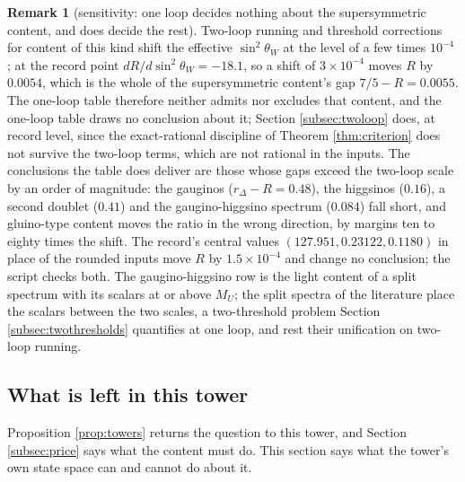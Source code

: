 \documentclass[11pt]{article}
\theoremstyle{definition}
\newtheorem{remark}[theorem]{Remark}
\newcommand{\Dl}{\Delta}
\begin{document}
\begin{remark}[sensitivity: one loop decides nothing about the supersymmetric content, and does decide the rest]\label{rem:sensitivity}
Two-loop running and threshold corrections for content of this kind shift the effective $\sin^{2}\theta_{W}$ at the level of a few times $10^{-4}$ \cite{Amaldi1991, DimopoulosRabyWilczek1981}; at the record point $dR/d\sin^{2}\theta_{W} = -18.1$, so a shift of $3 \times 10^{-4}$ moves $R$ by $0.0054$, which is the whole of the supersymmetric content's gap $7/5 - R = 0.0055$. The one-loop table therefore neither admits nor excludes that content, and the one-loop table draws no conclusion about it; Section \ref{subsec:twoloop} does, at record level, since the exact-rational discipline of Theorem \ref{thm:criterion} does not survive the two-loop terms, which are not rational in the inputs. The conclusions the table does deliver are those whose gaps exceed the two-loop scale by an order of magnitude: the gauginos ($r_{\Dl} - R = 0.48$), the higgsinos ($0.16$), a second doublet ($0.41$) and the gaugino-higgsino spectrum ($0.084$) fall short, and gluino-type content moves the ratio in the wrong direction, by margins ten to eighty times the shift. The record's central values $(127.951, 0.23122, 0.1180)$ in place of the rounded inputs move $R$ by $1.5 \times 10^{-4}$ and change no conclusion; the script checks both. The gaugino-higgsino row is the light content of a split spectrum with its scalars at or above $M_{U}$; the split spectra of the literature \cite{GiudiceRomanino2004, ArkaniHamedDimopoulos2005} place the scalars between the two scales, a two-threshold problem Section \ref{subsec:twothresholds} quantifies at one loop, and rest their unification on two-loop running.
\end{remark}


\subsection{What is left in this tower}\label{subsec:tower}

Proposition \ref{prop:towers} returns the question to this tower, and Section \ref{subsec:price} says what the content must do. This section says what the tower's own state space can and cannot do about it.
\end{document}
